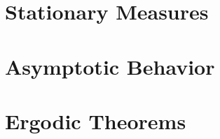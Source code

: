 
\section{Stationary Measures}

\section{Asymptotic Behavior}

\section{Ergodic Theorems}

\begin{definition}

\end{definition}

\begin{theorem}

\end{theorem}

\begin{example}

\end{example}
